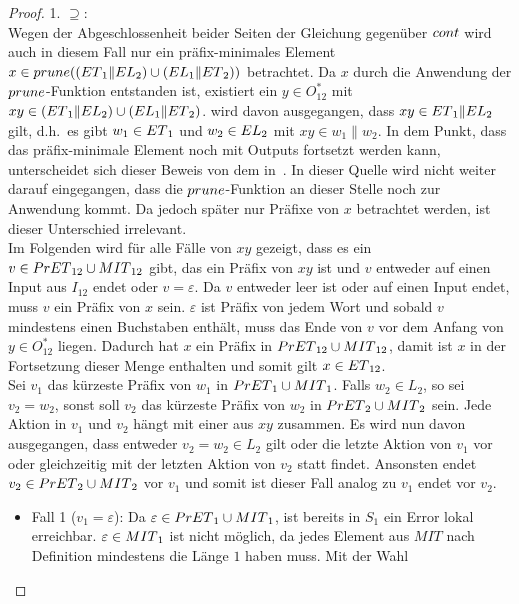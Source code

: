 \begin{proof}
  1. \glqq{}$\supseteq$\grqq{}:\\
  Wegen der Abgeschlossenheit beider Seiten der Gleichung gegenüber $cont{}$
  wird auch in diesem Fall nur ein präfix-minimales Element $x\in
  prune{}((ET{}_1\|EL{}_2)\cup (EL{}_1\|ET{}_2))$ betrachtet. Da $x$ durch
  die Anwendung der $prune{}$-Funktion entstanden ist, existiert ein $y\in
  O_{12}^*$ mit $xy\in(ET{}_1\|EL{}_2)\cup (EL{}_1\|ET{}_2)$. \OBdA{} wird
  davon ausgegangen, dass
  $xy\in ET{}_1\|EL{}_2$ gilt, d.h.\ es gibt $w_1\in ET{}_1$ und $w_2\in EL{}_2$ mit
  $xy\in w_1\|w_2$. In dem Punkt, dass das präfix-minimale Element noch mit
  Outputs fortsetzt werden kann, unterscheidet sich dieser Beweis von dem
  in~\cite{Schlosser2012BA}. In dieser Quelle wird nicht weiter darauf eingegangen, dass
  die $prune{}$-Funktion an dieser Stelle noch zur Anwendung kommt. Da jedoch später nur
  Präfixe von $x$ betrachtet werden, ist dieser Unterschied irrelevant.\\
  Im Folgenden wird für alle Fälle von $xy$ gezeigt, dass es ein $v\in
  PrET{}_{12}\cup MIT{}_{12}$ gibt, das ein Präfix von $xy$ ist und $v$
  entweder auf einen Input aus $I_{12}$ endet oder $v = \varepsilon$. Da $v$
  entweder leer ist oder auf einen Input endet, muss $v$ ein Präfix von $x$
  sein. $\varepsilon$ ist Präfix von jedem Wort und sobald $v$ mindestens einen
  Buchstaben enthält, muss das Ende von $v$ vor dem Anfang von $y\in O_{12}^*$
  liegen. Dadurch hat $x$ ein Präfix in $PrET{}_{12}\cup MIT{}_{12}$, damit ist $x$ in
  der Fortsetzung dieser Menge enthalten und somit gilt $x\in ET{}_{12}$.\\
  Sei $v_1$ das kürzeste Präfix von $w_1$ in $PrET{}_1\cup MIT{}_1$. Falls
  $w_2\in L_2$, so sei $v_2=w_2$, sonst soll $v_2$ das kürzeste Präfix von
  $w_2$ in $PrET{}_2\cup MIT{}_2$ sein. Jede Aktion in $v_1$ und $v_2$ hängt mit
  einer aus $xy$ zusammen. Es wird nun davon ausgegangen, dass entweder
  $v_2=w_2\in L_2$ gilt oder die letzte Aktion von $v_1$ vor oder
  gleichzeitig mit der letzten Aktion von $v_2$ statt findet. Ansonsten endet
  $v_2\in PrET{}_2\cup MIT{}_2$ vor $v_1$ und somit ist dieser Fall analog zu $v_1$
  endet vor $v_2$.
  \begin{itemize}
    \item Fall 1 ($v_1=\varepsilon$): Da $\varepsilon\in PrET{}_1\cup
      MIT{}_1$, ist bereits in $S_1$ ein Error lokal erreichbar. $\varepsilon\in
      MIT{}_1$ ist nicht möglich, da jedes Element aus $MIT$ nach Definition
      mindestens die Länge $1$ haben muss. Mit der Wahl

\end{itemize}
\end{proof}
